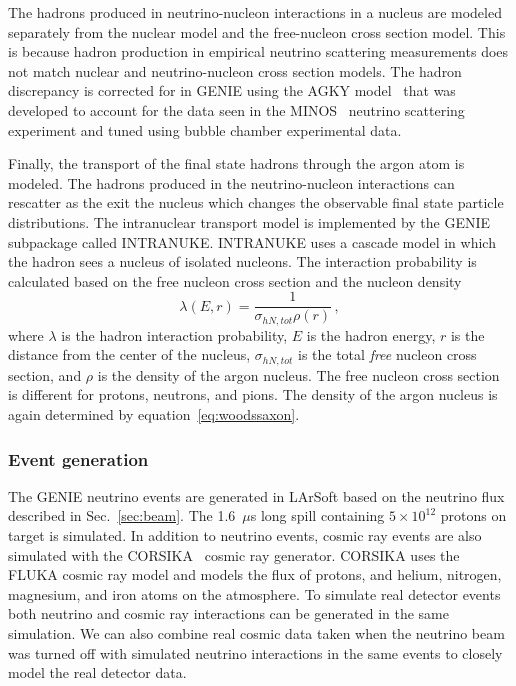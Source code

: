     The hadrons produced in neutrino-nucleon interactions in a nucleus are
    modeled separately from the nuclear model and the free-nucleon cross
    section model. This is because hadron production in empirical neutrino
    scattering measurements does not match nuclear and neutrino-nucleon cross
    section models. The hadron discrepancy is corrected for in GENIE using the
    AGKY model~\cite{AGKY} that was developed to account for the data seen in
    the MINOS~\cite{MINOS} neutrino scattering experiment and tuned using
    bubble chamber experimental data.

    Finally, the transport of the final state hadrons through the argon atom is
    modeled. The hadrons produced in the neutrino-nucleon interactions can
    rescatter as the exit the nucleus which changes the observable final state
    particle distributions. The intranuclear transport model is implemented by
    the GENIE subpackage called INTRANUKE. INTRANUKE uses a cascade model in
    which the hadron sees a nucleus of isolated nucleons. The interaction
    probability is calculated based on the free nucleon cross section and the
    nucleon density~\cite{Andreopoulos:2015wxa}
    \begin{equation}
      \lambda(E,r) = \frac{1}{\sigma_{hN,tot} \rho(r)} \,,
    \end{equation}
    where $\lambda$ is the hadron interaction probability, $E$ is the hadron
    energy, $r$ is the distance from the center of the nucleus,
    $\sigma_{hN,tot}$ is the total \textit{free} nucleon cross section, and
    $\rho$ is the density of the argon nucleus. The free nucleon cross section
    is different for protons, neutrons, and pions. The density of the argon
    nucleus is again determined by equation~\ref{eq:woodssaxon}.

  \subsubsection{Event generation}
    The GENIE neutrino events are generated in LArSoft based on the neutrino
    flux described in Sec.~\ref{sec:beam}. The 1.6~$\mu$s long spill containing
    $5\times 10^{12}$ protons on target is simulated.  In addition to neutrino
    events, cosmic ray events are also simulated with the
    CORSIKA~\cite{corsika} cosmic ray generator. CORSIKA uses the FLUKA cosmic
    ray model and models the flux of protons, and helium, nitrogen, magnesium,
    and iron atoms on the atmosphere. To simulate real detector events both
    neutrino and cosmic ray interactions can be generated in the same
    simulation. We can also combine real cosmic data taken when the neutrino
    beam was turned off with simulated neutrino interactions in the same events
    to closely model the real detector data.

